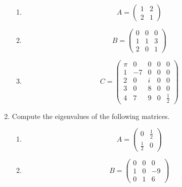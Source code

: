 \begin{enumerate}
	\begin{enumerate}
		\item 
		$$
		A = \begin{pmatrix}
		1&2\\
		2&1
		\end{pmatrix}
		$$
		\item
		$$
		B = \begin{pmatrix}
		0&0&0\\
		1&1&3\\
		2&0&1
		\end{pmatrix}
		$$
		\item 
		$$C=
		\begin{pmatrix}
		\pi& 0& 0& 0 &0\\
		1 & -7&  0& 0 &0\\
		2 & 0& i  & 0 &0\\
		3 & 0& 8  & 0 & 0\\
		4 & 7& 9& 0& \frac{1}{2}
		\end{pmatrix}
		$$
	\end{enumerate}
	\item Compute the eigenvalues of the following matrices.
	\begin{enumerate}
		\item $$ A= 
		\begin{pmatrix}
		0&\frac{1}{2}\\
		\frac{1}{2}&0
		\end{pmatrix}
		$$
		\item
		$$ B=
		\begin{pmatrix}
		0&0&0\\
		1&0&-9\\
		0&1&6
		\end{pmatrix}
		$$
	\end{enumerate}
	

\end{enumerate}
